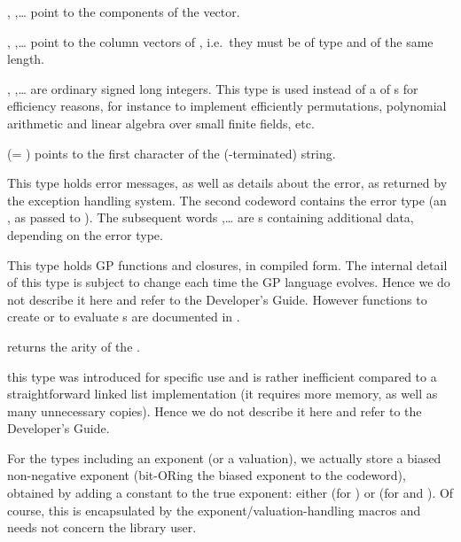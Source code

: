 %
, ,\dots {} point to the components of the
vector.

 ,
,\dots {} point to the column vectors of ,
i.e.~they must be of type  and of the same length.

, ,\dots {} are ordinary signed long
integers. This type is used instead of a  of s for
efficiency reasons, for instance to implement efficiently permutations,
polynomial arithmetic and linear algebra over small finite fields, etc.

%

 (= ) points to the first character of the
(-terminated) string.

This type holds error messages, as well as details about the error, as
returned by the exception handling system. The second codeword 
contains the error type (an , as passed to ). The
subsequent words ,\dots {} are s containing
additional data, depending on the error type.

This type holds GP functions and closures, in compiled form. The internal detail
of this type is subject to change each time the GP language evolves. Hence we
do not describe it here and refer to the Developer's Guide.  However
functions to create or to evaluate s are documented in
.

 returns the arity of the .

this type was introduced for specific  use and is rather inefficient
compared to a straightforward linked list implementation (it requires more
memory, as well as many unnecessary copies). Hence we do not describe it
here and refer to the Developer's Guide.

 For the types including an exponent (or a
valuation), we actually store a biased non-negative exponent (bit-ORing the
biased exponent to the codeword), obtained by adding a constant to the true
exponent: either  (for ) or  (for
 and ). Of course, this is encapsulated by the
exponent/valuation-handling macros and needs not concern the library user.

